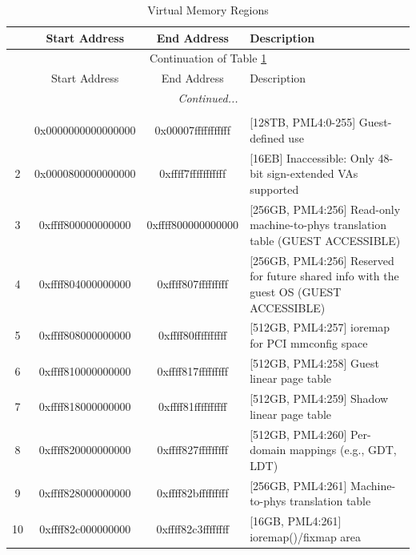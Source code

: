 \clearpage
\begin{longtable}[htp!]{|c|c|c|m{}|}
    \caption{Virtual Memory Regions\label{tab:xen_address}}\\
    \hline
    & Start Address      & End Address        & Description \\
    \hline
    \hline
    \endfirsthead
    \hline
    \multicolumn{4}{|c|}{Continuation of Table \ref{tab:xen_address}}\\
    \hline
    \hline
    & Start Address      & End Address        & Description \\
    \hline
    \hline
    \endhead
    \hline
    \hline
    \multicolumn{4}{|c|}{\textit{Continued...}}\\
    \hline
    \endfoot
    \hline
    \hline
    \multicolumn{4}{|c|}{End of Table \ref{tab:xen_address}}\\
    \hline
    \endlastfoot
    1  & 0x0000000000000000  & 0x00007fffffffffff & [128TB, PML4:0-255] Guest-defined use \\
    \hline
    2  & 0x0000800000000000  & 0xffff7fffffffffff & [16EB] Inaccessible: Only 48-bit sign-extended VAs supported\\
    \hline
    3  & 0xffff800000000000  & 0xffff800000000000 & [256GB, PML4:256] Read-only machine-to-phys translation table (GUEST ACCESSIBLE) \\
    \hline
    4  & 0xffff804000000000  & 0xffff807fffffffff & [256GB, PML4:256] Reserved for future shared info with the guest OS (GUEST ACCESSIBLE) \\
    \hline
    5  & 0xffff808000000000  & 0xffff80ffffffffff & [512GB, PML4:257] ioremap for PCI mmconfig space \\
    \hline
    6  & 0xffff810000000000  & 0xffff817fffffffff & [512GB, PML4:258] Guest linear page table \\
    \hline
    7  & 0xffff818000000000  & 0xffff81ffffffffff & [512GB, PML4:259] Shadow linear page table \\
    \hline
    8  & 0xffff820000000000  & 0xffff827fffffffff & [512GB, PML4:260] Per-domain mappings (e.g., GDT, LDT) \\
    \hline
    9  & 0xffff828000000000  & 0xffff82bfffffffff & [256GB, PML4:261] Machine-to-phys translation table \\
    \hline
    10 & 0xffff82c000000000  & 0xffff82c3ffffffff & [16GB, PML4:261] ioremap()/fixmap area \\

\end{longtable}

